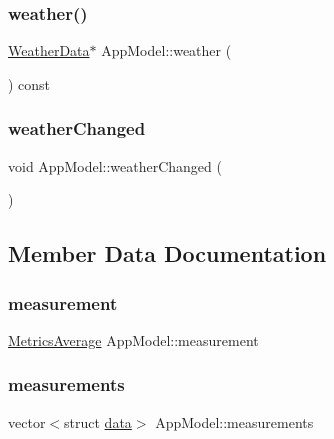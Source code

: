 \subsubsection{\texorpdfstring{weather()}{weather()}}
{\footnotesize\ttfamily \hyperlink{class_weather_data}{Weather\+Data}$\ast$ App\+Model\+::weather (\begin{DoxyParamCaption}{ }\end{DoxyParamCaption}) const}

\mbox{\label{class_app_model_a83e61455ed5672333b0db45f3f86417c}} 
\subsubsection{\texorpdfstring{weather\+Changed}{weatherChanged}}
{\footnotesize\ttfamily void App\+Model\+::weather\+Changed (\begin{DoxyParamCaption}{ }\end{DoxyParamCaption})\hspace{0.3cm}{\ttfamily [signal]}}



\subsection{Member Data Documentation}
\mbox{\label{class_app_model_a91ca3de4d7513b5406dbb34995244a0b}} 
\subsubsection{\texorpdfstring{measurement}{measurement}}
{\footnotesize\ttfamily \hyperlink{class_metrics_average}{Metrics\+Average} App\+Model\+::measurement}

\mbox{\label{class_app_model_aedc9eb083a5b230134be32865a6a5152}} 
\subsubsection{\texorpdfstring{measurements}{measurements}}
{\footnotesize\ttfamily vector$<$struct \hyperlink{structdata}{data}$>$ App\+Model\+::measurements}

